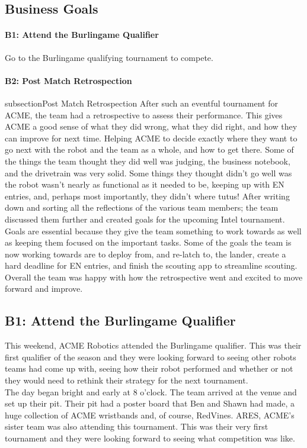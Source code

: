 \documentclass{article}
\begin{document}
\subsection{Business Goals}
\paragraph{B1: Attend the Burlingame Qualifier}
 Go to the Burlingame qualifying tournament to compete.
\paragraph{B2: Post Match Retrospection}
subsection{Post Match Retrospection}
After such an eventful tournament for ACME, the team had a retrospective to assess their performance. This gives ACME a good sense of what they did wrong, what they did right, and how they can improve for next time. Helping ACME to decide exactly where they want to go next with the robot and the team as a whole, and how to get there. Some of the things the team thought they did well was judging, the business notebook, and the drivetrain was very solid. Some things they thought didn’t go well was the robot wasn’t nearly as functional as it needed to be, keeping up with EN entries, and, perhaps most importantly, they didn’t where tutus! After writing down and sorting all the reflections of the various team members; the team discussed them further and created goals for the upcoming Intel tournament. Goals are essential because they give the team something to work towards as well as keeping them focused on the important tasks. Some of the goals the team is now working towards are to deploy from, and re-latch to, the lander, create a hard deadline for EN entries, and finish the scouting app to streamline scouting. Overall the team was happy with how the retrospective went and excited to move forward and improve. 
\newpage
\subsection{B1: Attend the Burlingame Qualifier}

This weekend, ACME Robotics attended the Burlingame qualifier. This was their first qualifier of the season and they were looking forward to seeing other robots teams had come up with, seeing how their robot performed and whether or not they would need to rethink their strategy for the next tournament.\\

The day began bright and early at 8 o'clock. The team arrived at the venue and set up their pit. Their pit had a poster board that Ben and Shawn had made, a huge collection of ACME wristbands and, of course, RedVines. ARES, ACME's sister team was also attending this tournament. This was their very first tournament and they were looking forward to seeing what competition was like. \\
\end{document}

